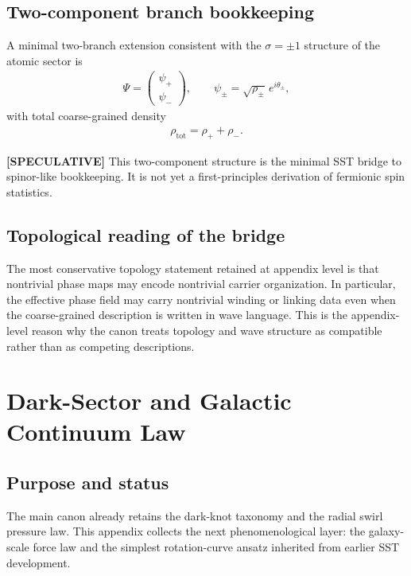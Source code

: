 \documentclass[11pt]{article}
\theoremstyle{definition}
\theoremstyle{plain}
\theoremstyle{remark}
\begin{document}
    \subsection{Two-component branch bookkeeping}
        A minimal two-branch extension consistent with the \(\sigma=\pm1\) structure of the atomic sector is
        \begin{align}
            \Psi
            =
            \begin{pmatrix}
                \psi_{+}\\
                \psi_{-}
            \end{pmatrix},
            \qquad
            \psi_{\pm}
            =
            \sqrt{\rho_{\pm}}\,e^{i\theta_{\pm}},
            \label{eq:two_component_bridge}
        \end{align}
        with total coarse-grained density
        \begin{align}
            \rho_{\mathrm{tot}} = \rho_{+}+\rho_{-}.
        \end{align}
        
        \textbf{[SPECULATIVE]} This two-component structure is the minimal SST bridge to spinor-like bookkeeping. It is not yet a first-principles derivation of fermionic spin statistics.
    
    \subsection{Topological reading of the bridge}
        The most conservative topology statement retained at appendix level is that nontrivial phase maps may encode nontrivial carrier organization. In particular, the effective phase field may carry nontrivial winding or linking data even when the coarse-grained description is written in wave language. This is the appendix-level reason why the canon treats topology and wave structure as compatible rather than as competing descriptions.
    
    \section{Dark-Sector and Galactic Continuum Law}
    \label{sec:appendix_dark_galactic}
    
    \subsection{Purpose and status}
        The main canon already retains the dark-knot taxonomy and the radial swirl pressure law. This appendix collects the next phenomenological layer: the galaxy-scale force law and the simplest rotation-curve ansatz inherited from earlier SST development.
        
\end{document}
